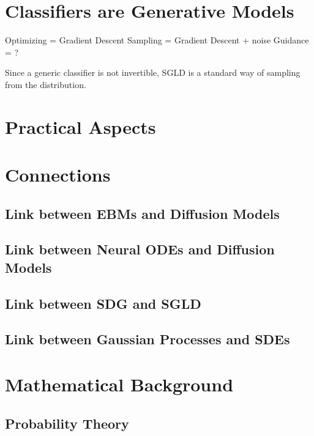 \documentclass[a4paper, 11pt]{article}
\begin{document}
\section{Classifiers are Generative Models}

Optimizing = Gradient Descent
Sampling = Gradient Descent + noise
Guidance = ?

Since a generic classifier is not invertible, SGLD is a standard way of sampling from the distribution.

\section{Practical Aspects}

\section{Connections}
\subsection{Link between EBMs and Diffusion Models}
\subsection{Link between Neural ODEs and Diffusion Models}
\subsection{Link between SDG and SGLD}
\subsection{Link between Gaussian Processes and SDEs}

\appendix
\section{Mathematical Background}
\subsection{Probability Theory}


 

\end{document}
